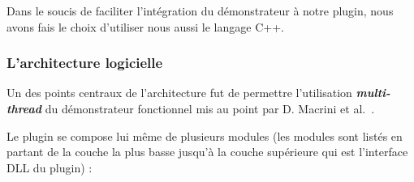 Dans le soucis de faciliter l'intégration du démonstrateur à notre plugin, nous avons fais le choix d'utiliser nous aussi le langage C++.

\subsubsection{L'architecture logicielle}

Un des points centraux de l'architecture fut de permettre l'utilisation \textbf{\textit{multi-thread}} du démonstrateur fonctionnel mis au point par  D. Macrini et al.~\cite{Macrini2002}. 

Le plugin se compose lui même de plusieurs modules (les modules sont listés en partant de la couche la plus basse jusqu'à la couche supérieure qui est l'interface DLL du plugin) :

